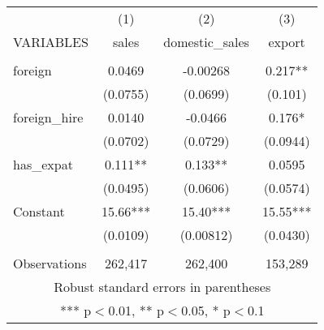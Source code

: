 \begin{tabular}{lccc} \hline
 & (1) & (2) & (3) \\
VARIABLES & sales & domestic\_sales & export \\ \hline
 &  &  &  \\
foreign & 0.0469 & -0.00268 & 0.217** \\
 & (0.0755) & (0.0699) & (0.101) \\
foreign\_hire & 0.0140 & -0.0466 & 0.176* \\
 & (0.0702) & (0.0729) & (0.0944) \\
has\_expat & 0.111** & 0.133** & 0.0595 \\
 & (0.0495) & (0.0606) & (0.0574) \\
Constant & 15.66*** & 15.40*** & 15.55*** \\
 & (0.0109) & (0.00812) & (0.0430) \\
 &  &  &  \\
 Observations & 262,417 & 262,400 & 153,289 \\ \hline
\multicolumn{4}{c}{ Robust standard errors in parentheses} \\
\multicolumn{4}{c}{ *** p$<$0.01, ** p$<$0.05, * p$<$0.1} \\
\end{tabular}
